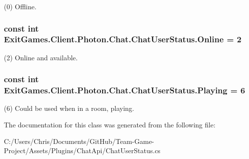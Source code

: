 (0) Offline.

\subsubsection[{\texorpdfstring{Online}{Online}}]{\setlength{\rightskip}{0pt plus 5cm}const int Exit\+Games.\+Client.\+Photon.\+Chat.\+Chat\+User\+Status.\+Online = 2}\hypertarget{class_exit_games_1_1_client_1_1_photon_1_1_chat_1_1_chat_user_status_af9f7b1d3f7cb4f6acb966679e7080ac2}{}\label{class_exit_games_1_1_client_1_1_photon_1_1_chat_1_1_chat_user_status_af9f7b1d3f7cb4f6acb966679e7080ac2}


(2) Online and available.

\subsubsection[{\texorpdfstring{Playing}{Playing}}]{\setlength{\rightskip}{0pt plus 5cm}const int Exit\+Games.\+Client.\+Photon.\+Chat.\+Chat\+User\+Status.\+Playing = 6}\hypertarget{class_exit_games_1_1_client_1_1_photon_1_1_chat_1_1_chat_user_status_a6db26d8e73bd24a01a9239caab6c6112}{}\label{class_exit_games_1_1_client_1_1_photon_1_1_chat_1_1_chat_user_status_a6db26d8e73bd24a01a9239caab6c6112}


(6) Could be used when in a room, playing.



The documentation for this class was generated from the following file\+:\begin{DoxyCompactItemize}
\item 
C\+:/\+Users/\+Chris/\+Documents/\+Git\+Hub/\+Team-\/\+Game-\/\+Project/\+Assets/\+Plugins/\+Chat\+Api/Chat\+User\+Status.\+cs\end{DoxyCompactItemize}
